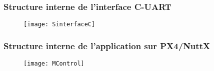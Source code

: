 \documentclass{beamer}
\begin{document}
\begin{frame}

	\frametitle{Structure interne de l'interface C-UART}

	\begin{figure}
	
		\texttt{[image: SinterfaceC]}
	
	\end{figure}

\end{frame}

\begin{frame}
	
	\frametitle{Structure interne de l'application sur PX4/NuttX}

	\begin{figure}
	
		\texttt{[image: MControl]}
	
	\end{figure}

\end{frame}
\end{document}
